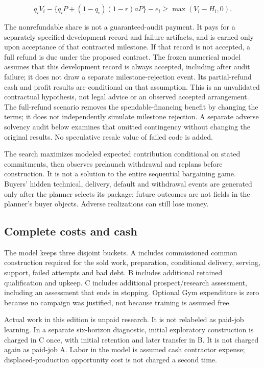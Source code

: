 \documentclass[
  11pt,
]{article}
\let\OriginalSubsection\subsection
\renewcommand{\subsection}{\needspace{6\baselineskip}\OriginalSubsection}
\begin{document}
\[
q_i V_i-\{q_iP+(1-q_i)(1-r)aP\}-e_i
\geq \max(V_i-H_i,0).
\]

The nonrefundable share is not a guaranteed-audit payment. It pays for a
separately specified development record and failure artifacts, and is
earned only upon acceptance of that contracted milestone. If that record
is not accepted, a full refund is due under the proposed contract. The
frozen numerical model assumes that this development record is always
accepted, including after audit failure; it does not draw a separate
milestone-rejection event. Its partial-refund cash and profit results
are conditional on that assumption. This is an unvalidated contractual
hypothesis, not legal advice or an observed accepted arrangement. The
full-refund scenario removes the spendable-financing benefit by changing
the terms; it does not independently simulate milestone rejection. A
separate adverse solvency audit below examines that omitted contingency
without changing the original results. No speculative resale value of
failed code is added.

The search maximizes modeled expected contribution conditional on stated
commitments, then observes prelaunch withdrawal and replans before
construction. It is not a solution to the entire sequential bargaining
game. Buyers' hidden technical, delivery, default and withdrawal events
are generated only after the planner selects its package; future
outcomes are not fields in the planner's buyer objects. Adverse
realizations can still lose money.

\hypertarget{complete-costs-and-cash}{%
\subsection{Complete costs and cash}\label{complete-costs-and-cash}}

The model keeps three disjoint buckets. A includes commissioned common
construction required for the sold work, preparation, conditional
delivery, serving, support, failed attempts and bad debt. B includes
additional retained qualification and upkeep. C includes additional
prospect/research assessment, including an assessment that ends in
stopping. Optional Gym expenditure is zero because no campaign was
justified, not because training is assumed free.

Actual work in this edition is unpaid research. It is not relabeled as
paid-job learning. In a separate six-horizon diagnostic, initial
exploratory construction is charged in C once, with initial retention
and later transfer in B. It is not charged again as paid-job A. Labor in
the model is assumed cash contractor expense; displaced-production
opportunity cost is not charged a second time.
\end{document}
